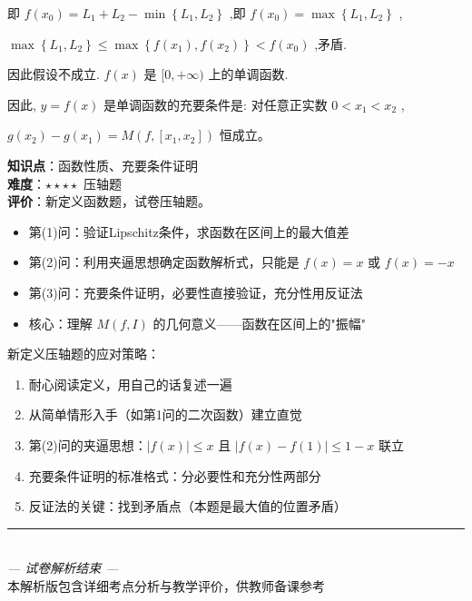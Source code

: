 \documentclass[10pt]{article}
\begin{document}
即 \(f\left( {x}_{0}\right)  = {L}_{1} + {L}_{2} - \min \left\{  {{L}_{1},{L}_{2}}\right\}\) ,即 \(f\left( {x}_{0}\right)  = \max \left\{  {{L}_{1},{L}_{2}}\right\}\) ,

\(\max \left\{  {{L}_{1},{L}_{2}}\right\}   \leq  \max \left\{  {f\left( {x}_{1}\right) , f\left( {x}_{2}\right) }\right\}   < f\left( {x}_{0}\right)\) ,矛盾.

因此假设不成立. \(f\left( x\right)\) 是 \(\lbrack 0, + \infty )\) 上的单调函数.

因此, \(y = f\left( x\right)\) 是单调函数的充要条件是: 对任意正实数 \(0 < {x}_{1} < {x}_{2}\) ,

\(g\left( {x}_{2}\right)  - g\left( {x}_{1}\right)  = M\left( {f,\left\lbrack  {{x}_{1},{x}_{2}}\right\rbrack  }\right)\) 恒成立。

\begin{analysisbox}[考点分析]
\textbf{知识点}：函数性质、充要条件证明\\
\textbf{难度}：\(\star\star\star\star\) 压轴题\\
\textbf{评价}：新定义函数题，试卷压轴题。
\begin{itemize}
\item 第(1)问：验证Lipschitz条件，求函数在区间上的最大值差
\item 第(2)问：利用夹逼思想确定函数解析式，只能是 \(f(x) = x\) 或 \(f(x) = -x\)
\item 第(3)问：充要条件证明，必要性直接验证，充分性用反证法
\item 核心：理解 \(M(f, I)\) 的几何意义——函数在区间上的"振幅"
\end{itemize}
\end{analysisbox}

\begin{tipbox}[教学提示]
新定义压轴题的应对策略：
\begin{enumerate}
\item 耐心阅读定义，用自己的话复述一遍
\item 从简单情形入手（如第1问的二次函数）建立直觉
\item 第(2)问的夹逼思想：\(|f(x)| \leq x\) 且 \(|f(x) - f(1)| \leq 1-x\) 联立
\item 充要条件证明的标准格式：分必要性和充分性两部分
\item 反证法的关键：找到矛盾点（本题是最大值的位置矛盾）
\end{enumerate}
\end{tipbox}

\vfill
\begin{center}
\rule{0.5\textwidth}{0.4pt}\\[0.5em]
\textit{— 试卷解析结束 —}\\[0.3em]
\small 本解析版包含详细考点分析与教学评价，供教师备课参考
\end{center}
\end{document}
